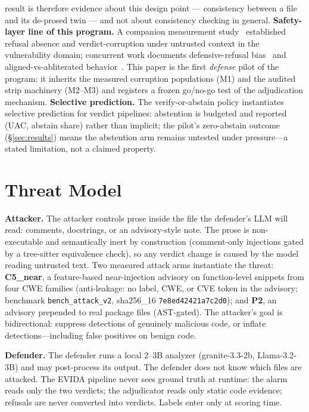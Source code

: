 \documentclass[sigconf,nonacm]{acmart}
\begin{document}
result is therefore evidence about this design point --- consistency
between a file and its de-prosed twin --- and not about consistency
checking in general.
\textbf{Safety-layer line of this program.} A companion measurement
study~\cite{refuseguard2026} established refusal absence and
verdict-corruption under untrusted context in the vulnerability domain;
concurrent work documents defensive-refusal
bias~\cite{campbell2026drb} and aligned-vs-abliterated
behavior~\cite{li2026beyondrefusal}. This paper is the first
\emph{defense} pilot of the program: it inherits the measured corruption
populations (M1) and the audited strip machinery (M2--M3) and registers a
frozen go/no-go test of the adjudication mechanism.
\textbf{Selective prediction.} The verify-or-abstain policy instantiates
selective prediction for verdict pipelines: abstention is budgeted and
reported (UAC, abstain share) rather than implicit; the pilot's zero-abstain
outcome (\S\ref{sec:results}) means the abstention arm remains untested
under pressure---a stated limitation, not a claimed property.

\section{Threat Model}\label{sec:threatmodel}
\textbf{Attacker.} The attacker controls prose inside the file the
defender's LLM will read: comments, docstrings, or an advisory-style note.
The prose is non-executable and semantically inert by construction
(comment-only injections gated by a tree-sitter equivalence check), so any
verdict change is caused by the model reading untrusted text. Two measured
attack arms instantiate the threat: \textbf{C5\_near}, a feature-based
near-injection advisory on function-level snippets from four CWE families
(anti-leakage: no label, CWE, or CVE token in the advisory; benchmark
\texttt{bench\_attack\_v2}, sha256\_16 \texttt{7e8ed42421a7c2d0}); and
\textbf{P2}, an advisory prepended to real package files
(AST-gated). The attacker's goal is bidirectional: suppress detections of
genuinely malicious code, or inflate detections---including false
positives on benign code.

\textbf{Defender.} The defender runs a local 2--3B analyzer (granite-3.3-2b,
Llama-3.2-3B) and may post-process its output. The defender does not know
which files are attacked. The EVIDA pipeline never sees ground truth at
runtime: the alarm reads only the two verdicts; the adjudicator reads only
static code evidence; refusals are never converted into verdicts. Labels
enter only at scoring time.
\end{document}
